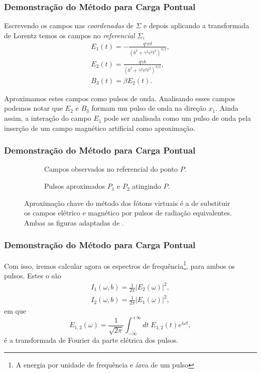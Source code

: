 \documentclass[xcolor=dvipsnames]{beamer}
\begin{document}
\begin{frame}
	\frametitle{Demonstração do Método para Carga Pontual}
	Escrevendo os campos nas \textit{coordenadas} de $\Sigma$ e depois
	aplicando a transformada de Lorentz temos os campos no \textit{referencial}
	$\Sigma$,
	\begin{gather}
		E_1 (t) = -\frac{q\gamma vt}{(b^2 + \gamma ^2 v^2t^2)^{3/2}}
			\label{eq_field1},\\
		E_2 (t) = \frac{q\gamma b}{(b^2 + \gamma ^2 v^2 t
			^2)^{3/2}}\label{eq_field2},\\ 
		B_3 (t) = \beta E_2(t) \label{eq_field3}.
	\end{gather}
	\begin{block}{Aproximamos estes campos como pulsos de onda.}
		Analisando esses campos podemos notar que $E_2$ e $B_3$ formam um pulso
		de onda na direção $x_1$. Ainda assim, a interação do campo $E_1$ pode
		ser analisada como um pulso de onda pela inserção de um campo magnético
		artificial como aproximação.
	\end{block}
\end{frame}

\begin{frame}
	\frametitle{Demonstração do Método para Carga Pontual}
	\begin{figure}
		\begin{subfigure}[b]{0.4\textwidth}
			\centering
			
			\caption{Campos observados no referencial do ponto $P$.}
		\end{subfigure}
		\hspace{1cm}
		\begin{subfigure}[b]{0.4\textwidth}
			\centering
			
			\caption{Pulsos aproximados $P_1$ e $P_2$ atingindo $P$.}
		\end{subfigure}
		\caption{Aproximação chave do método dos fótons virtuais é a de
		substituir os campos elétrico e magnético por pulsos de radiação
		equivalentes. Ambas as figuras adaptadas de \cite{caruso_quanta}.}
	\end{figure}
\end{frame}

\begin{frame}
	\frametitle{Demonstração do Método para Carga Pontual}
	Com isso, iremos calcular agora os espectros de frequência\footnote{A
	energia por unidade de frequência e área de um pulso}, para ambos os
	pulsos. Estes o são
	\begin{gather}
		I_1(\omega , b) = \frac{1}{2\pi} |E_2 (\omega) |^2 ,\\
		I_2 (\omega , b) = \frac{1}{2\pi} |E_1 (\omega)|^2,
	\end{gather}
	em que 
	\begin{equation}
		E_{1,2} (\omega) = \frac{1}{\sqrt{2\pi}} \int _{-\infty}^{+\infty}
		dt \; E _{1,2} (t) e^{i\omega t},
	\end{equation}
	é a transformada de Fourier da parte elétrica dos pulsos.
\end{frame}
\end{document}
